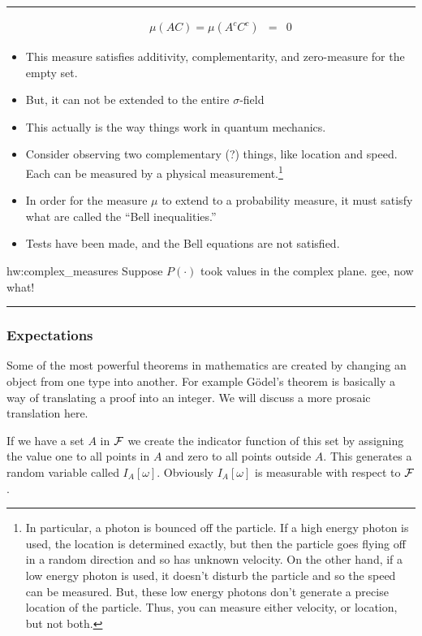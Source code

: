 \documentclass[14pt]{extarticle}
\newenvironment{textHW}{
  \noindent\rule{\textwidth}{1pt}%
  \begin{list}{}{
      \setlength{\labelwidth}{1cm}
      \setlength{\labelsep}{0.3cm}
      \setlength{\leftmargin}{1.3cm}
      \setlength{\rightmargin}{1cm}
      \setlength{\parsep}{0.5ex plus0.2ex minus0.1ex}
      \setlength{\topsep}{1pt plus3pt minus1pt}
      \setlength{\itemsep}{0ex plus0.2ex} 
      \renewcommand{\makelabel}[1]{\label{thw:##1}{\ref{##1}}}
      \sl}}%
  {\end{list}\rule{\textwidth}{1pt}}
\newcommand{\notes}{}
\begin{document}
\begin{textHW}
\begin{itemize}
\begin{eqnarray*}
    \mu(AC) = \mu(A^cC^c) & = & 0 
  \end{eqnarray*}
\item This  measure satisfies additivity, complementarity, and
  zero-measure for the empty set.
  \item But, it can not be extended to the entire $\sigma$-field 
  \item This actually is the way things work in quantum mechanics.  
  \item Consider observing two complementary (?) things, like location
    and speed.  Each can be measured by a physical
    measurement.\footnote{In particular, a photon is bounced off the
      particle.  If a high energy photon is used, the location is
      determined exactly, but then the particle goes flying off in a
      random direction and so has unknown velocity.  On the other
      hand, if a low energy photon is used, it doesn't disturb the
      particle and so the speed can be measured.  But, these low energy
      photons don't generate a precise location of the particle.
      Thus, you can measure either velocity, or location, but not both.}
  \item In order for the measure $\mu$ to extend to a probability
    measure, it must satisfy what are called the ``Bell inequalities.''
  \item Tests have been made, and the Bell equations are not
    satisfied. 
  \end{itemize}
\item[hw:complex_measures] Suppose $P(\cdot)$ took values in the
  complex plane.  {\notes gee, now what!}
\end{textHW}
 
        \subsubsection{Expectations}

Some of the most powerful theorems in mathematics are created by
changing an object from one type into another.  For example G\" odel's
theorem is basically a way of translating a proof into an integer.  We
will discuss a more prosaic translation here.

If we have a set $A$ in ${\cal F}$ we create the indicator function of
this set by assigning the value one to all points in $A$ and zero to
all points outside $A$.  This generates a random variable called
$I_A[\omega]$.  Obviously $I_A[\omega]$ is measurable with
respect to ${\cal F}$.  
\end{document}
